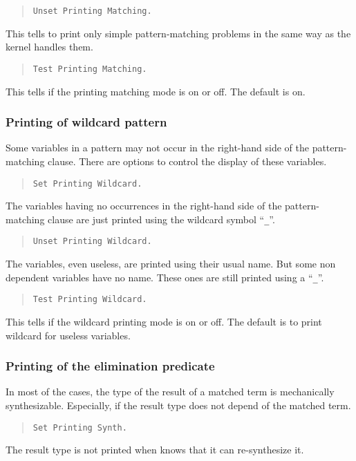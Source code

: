\begin{quote}
{\tt Unset Printing Matching.}
\end{quote}
This tells {\Coq} to print only simple pattern-matching problems in
the same way as the {\Coq} kernel handles them.

\begin{quote}
{\tt Test Printing Matching.}
\end{quote}
This tells if the printing matching mode is on or off. The default is
on.

\subsubsection{Printing of wildcard pattern
}

Some variables in a pattern may not occur in the right-hand side of
the pattern-matching clause.  There are options to control the
display of these variables.

\begin{quote}
{\tt Set Printing Wildcard.}
\end{quote}
The variables having no occurrences in the right-hand side of the
pattern-matching clause are just printed using the wildcard symbol
``{\tt \_}''.

\begin{quote}
{\tt Unset Printing Wildcard.}
\end{quote}
The variables, even useless, are printed using their usual name. But some
non dependent variables have no name. These ones are still printed
using a ``{\tt \_}''.

\begin{quote}
{\tt Test Printing Wildcard.}
\end{quote}
This tells if the wildcard printing mode is on or off. The default is
to print wildcard for useless variables.

\subsubsection{Printing of the elimination predicate
}

In most of the cases, the type of the result of a matched term is
mechanically synthesizable. Especially, if the result type does not
depend of the matched term.

\begin{quote}
{\tt Set Printing Synth.}
\end{quote}
The result type is not printed when {\Coq} knows that it can
re-synthesize it.

